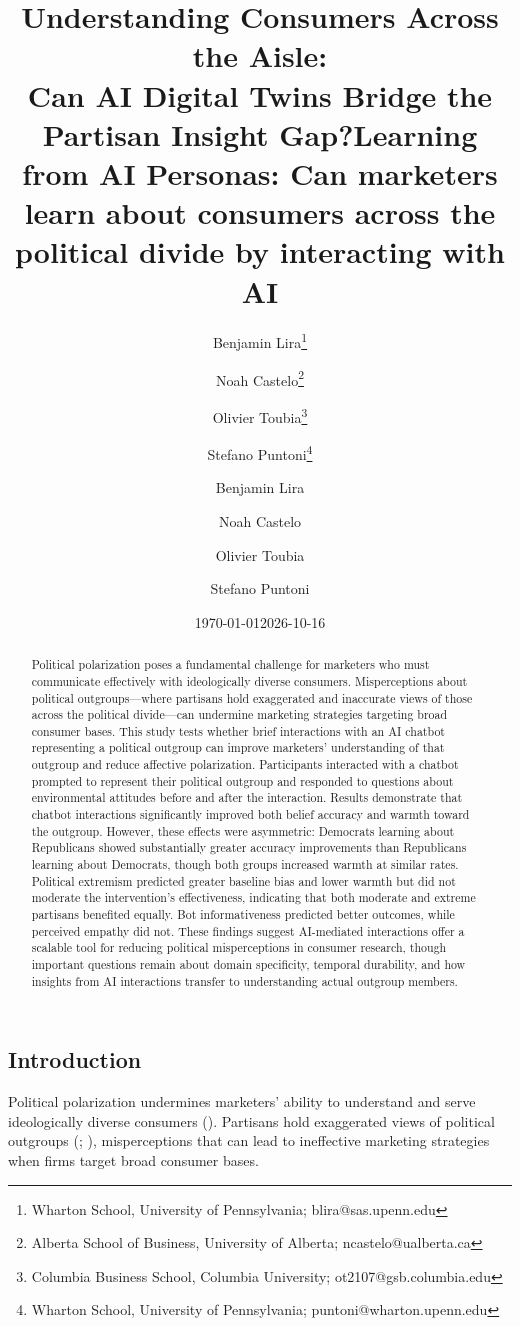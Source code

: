\documentclass[
  11pt,
  oneside]{article}
\title{Understanding Consumers Across the Aisle: \\
Can AI Digital Twins Bridge the Partisan Insight Gap?}
\author{
  Benjamin Lira\thanks{Wharton School, University of Pennsylvania; blira@sas.upenn.edu} \and
  Noah Castelo\thanks{Alberta School of Business, University of Alberta; ncastelo@ualberta.ca} \and
  Olivier Toubia\thanks{Columbia Business School, Columbia University; ot2107@gsb.columbia.edu} \and
  Stefano Puntoni\thanks{Wharton School, University of Pennsylvania; puntoni@wharton.upenn.edu}
}
\date{\today}
\title{Learning from AI Personas: Can marketers learn about consumers
across the political divide by interacting with AI}
\author{Benjamin Lira \and Noah Castelo \and Olivier Toubia \and Stefano
Puntoni}
\date{2026-10-16}
\begin{document}
\maketitle
\begin{abstract}
Political polarization poses a fundamental challenge for marketers who
must communicate effectively with ideologically diverse consumers.
Misperceptions about political outgroups---where partisans hold
exaggerated and inaccurate views of those across the political
divide---can undermine marketing strategies targeting broad consumer
bases. This study tests whether brief interactions with an AI chatbot
representing a political outgroup can improve marketers' understanding
of that outgroup and reduce affective polarization. Participants
interacted with a chatbot prompted to represent their political outgroup
and responded to questions about environmental attitudes before and
after the interaction. Results demonstrate that chatbot interactions
significantly improved both belief accuracy and warmth toward the
outgroup. However, these effects were asymmetric: Democrats learning
about Republicans showed substantially greater accuracy improvements
than Republicans learning about Democrats, though both groups increased
warmth at similar rates. Political extremism predicted greater baseline
bias and lower warmth but did not moderate the intervention's
effectiveness, indicating that both moderate and extreme partisans
benefited equally. Bot informativeness predicted better outcomes, while
perceived empathy did not. These findings suggest AI-mediated
interactions offer a scalable tool for reducing political misperceptions
in consumer research, though important questions remain about domain
specificity, temporal durability, and how insights from AI interactions
transfer to understanding actual outgroup members.
\end{abstract}


\subsection{Introduction}\label{introduction}

Political polarization undermines marketers' ability to understand and
serve ideologically diverse consumers
(). Partisans hold
exaggerated views of political outgroups
(;
),
misperceptions that can lead to ineffective marketing strategies when
firms target broad consumer bases.
\end{document}
